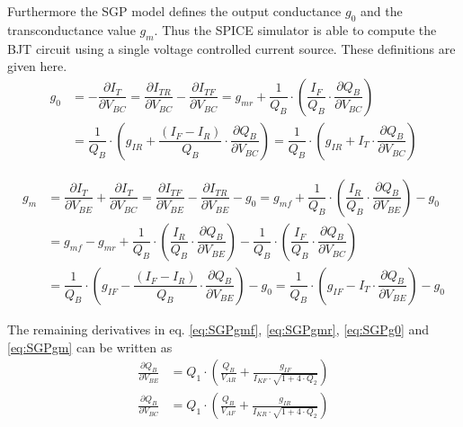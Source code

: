 \documentclass[10pt]{report}
\begin{document}
Furthermore the SGP model defines the output conductance $g_0$ and the
transconductance value $g_m$.  Thus the SPICE simulator is able to
compute the BJT circuit using a single voltage controlled current
source.  These definitions are given here.
\begin{equation}
\begin{split}
g_0 &= - \dfrac{\partial I_{T}}{\partial V_{BC}} = \dfrac{\partial I_{TR}}{\partial V_{BC}} - \dfrac{\partial I_{TF}}{\partial V_{BC}} = g_{mr} + \dfrac{1}{Q_B}\cdot\left(\dfrac{I_F}{Q_B}\cdot\dfrac{\partial Q_B}{\partial V_{BC}}\right)\\
&= \dfrac{1}{Q_B}\cdot\left(g_{IR} + \dfrac{\left(I_F - I_R\right)}{Q_B}\cdot\dfrac{\partial Q_B}{\partial V_{BC}}\right) = \dfrac{1}{Q_B}\cdot\left(g_{IR} + I_{T}\cdot\dfrac{\partial Q_B}{\partial V_{BC}}\right)
\end{split}
\label{eq:SGPg0}
\end{equation}

\begin{equation}
\begin{split}
g_m &= \dfrac{\partial I_{T}}{\partial V_{BE}} + \dfrac{\partial I_{T}}{\partial V_{BC}} = \dfrac{\partial I_{TF}}{\partial V_{BE}} - \dfrac{\partial I_{TR}}{\partial V_{BE}} - g_0 = g_{mf} + \dfrac{1}{Q_B}\cdot\left(\dfrac{I_R}{Q_B}\cdot\dfrac{\partial Q_B}{\partial V_{BE}}\right) - g_0\\
&= g_{mf} - g_{mr} + \dfrac{1}{Q_B}\cdot\left(\dfrac{I_R}{Q_B}\cdot\dfrac{\partial Q_B}{\partial V_{BE}}\right) - \dfrac{1}{Q_B}\cdot\left(\dfrac{I_F}{Q_B}\cdot\dfrac{\partial Q_B}{\partial V_{BC}}\right)\\
&= \dfrac{1}{Q_B}\cdot\left(g_{IF} - \dfrac{\left(I_F - I_R\right)}{Q_B}\cdot\dfrac{\partial Q_B}{\partial V_{BE}}\right) - g_0 = \dfrac{1}{Q_B}\cdot\left(g_{IF} - I_T\cdot\dfrac{\partial Q_B}{\partial V_{BE}}\right) - g_0
\end{split}
\label{eq:SGPgm}
\end{equation}

The remaining derivatives in eq. \eqref{eq:SGPgmf}, \eqref{eq:SGPgmr},
\eqref{eq:SGPg0} and \eqref{eq:SGPgm} can be written as
\begin{align}
\frac{\partial Q_B}{\partial V_{BE}} &= Q_1\cdot \left(\frac{Q_B}{V_{AR}} + \frac{g_{IF}}{I_{KF}\cdot \sqrt{1 + 4\cdot Q_2}}\right)\\
\frac{\partial Q_B}{\partial V_{BC}} &= Q_1\cdot \left(\frac{Q_B}{V_{AF}} + \frac{g_{IR}}{I_{KR}\cdot \sqrt{1 + 4\cdot Q_2}}\right)
\end{align}
\end{document}
